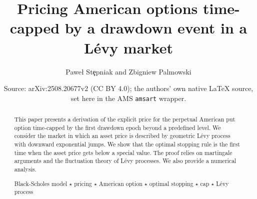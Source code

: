 \documentclass[10pt,a4paper]{amsart}
\title{Pricing American options time-capped by a drawdown event in a L\'evy market}
\author{Pawe{\l} St{\c{e}}pniak and Zbigniew Palmowski}
\date{Source: arXiv:2508.20677v2 (CC BY 4.0); the authors' own native \LaTeX{} source, set here in the AMS \texttt{amsart} wrapper.}
\begin{document}
\maketitle
	\begin{abstract}
		This paper presents a derivation of the explicit price for the perpetual American put option time-capped by the first drawdown epoch beyond a predefined level.
		We consider the market in which an asset price is described by geometric L\'evy process with downward exponential jumps.
		We show that the optimal stopping rule is the first time when the asset price gets below a special value.
		The proof relies on martingale arguments and the fluctuation theory of L\'evy processes. We also provide a numerical analysis.
		\vspace{3mm}
		
		Black-Scholes model  $\star$ pricing $\star$ American option $\star$ optimal stopping $\star$ cap $\star$ L\'evy process
		
		
	\end{abstract}
\end{document}
